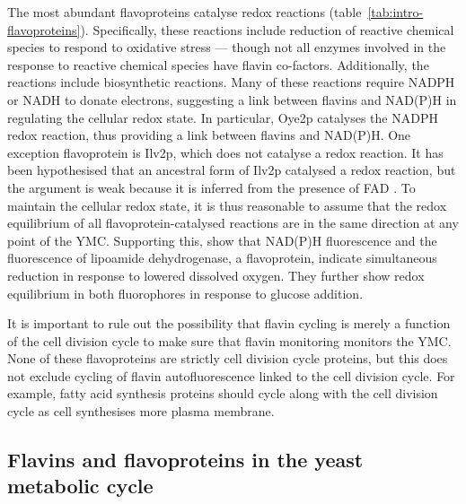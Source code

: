 The most abundant flavoproteins catalyse redox reactions (table~\ref{tab:intro-flavoproteins}).
Specifically, these reactions include reduction of reactive chemical species to respond to oxidative stress --- though not all enzymes involved in the response to reactive chemical species have flavin co-factors.
Additionally, the reactions include biosynthetic reactions.
Many of these reactions require NADPH or NADH to donate electrons, suggesting a link between flavins and NAD(P)H in regulating the cellular redox state.
In particular, Oye2p catalyses the NADPH redox reaction, thus providing a link between flavins and NAD(P)H.
One exception flavoprotein is Ilv2p, which does not catalyse a redox reaction.
It has been hypothesised that an ancestral form of Ilv2p catalysed a redox reaction, but the argument is weak because it is inferred from the presence of FAD \parencite{pangCrystalStructureYeast2002}.
To maintain the cellular redox state, it is thus reasonable to assume that the redox equilibrium of all flavoprotein-catalysed reactions are in the same direction at any point of the YMC.
Supporting this, \textcite{sianoNADHFlavinFluorescence1989} show that NAD(P)H fluorescence and the fluorescence of lipoamide dehydrogenase, a flavoprotein, indicate simultaneous reduction in response to lowered dissolved oxygen.
They further show redox equilibrium in both fluorophores in response to glucose addition.

It is important to rule out the possibility that flavin cycling is merely a function of the cell division cycle to make sure that flavin monitoring monitors the YMC.
None of these flavoproteins are strictly cell division cycle proteins, but this does not exclude cycling of flavin autofluorescence linked to the cell division cycle.
For example, fatty acid synthesis proteins should cycle along with the cell division cycle as cell synthesises more plasma membrane.

\subsection{Flavins and flavoproteins in the yeast metabolic cycle}
\label{subsec:intro-flavin-ymc}

